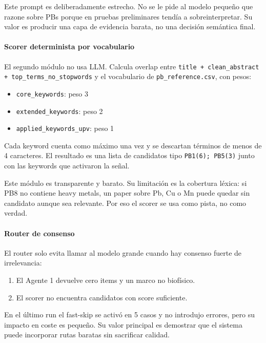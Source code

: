 Este prompt es deliberadamente estrecho. No se le pide al modelo pequeño que razone sobre PBs porque en pruebas preliminares tendía a sobreinterpretar. Su valor es producir una capa de evidencia barata, no una decisión semántica final.

\paragraph*{Scorer determinista por vocabulario}

El segundo módulo no usa LLM. Calcula overlap entre \texttt{title + clean\_abstract + top\_terms\_no\_stopwords} y el vocabulario de \texttt{pb\_reference.csv}, con pesos:

\begin{itemize}
\item \texttt{core\_keywords}: peso 3
\item \texttt{extended\_keywords}: peso 2
\item \texttt{applied\_keywords\_upv}: peso 1
\end{itemize}

Cada keyword cuenta como máximo una vez y se descartan términos de menos de 4 caracteres. El resultado es una lista de candidatos tipo \texttt{PB1(6); PB5(3)} junto con las keywords que activaron la señal.

Este módulo es transparente y barato. Su limitación es la cobertura léxica: si PB8 no contiene heavy metals, un paper sobre Pb, Cu o Mn puede quedar sin candidato aunque sea relevante. Por eso el scorer se usa como pista, no como verdad.

\paragraph*{Router de consenso}

El router solo evita llamar al modelo grande cuando hay consenso fuerte de irrelevancia:

\begin{enumerate}
\item El Agente 1 devuelve cero items y un marco no biofísico.
\item El scorer no encuentra candidatos con score suficiente.
\end{enumerate}

En el último run el fast-skip se activó en 5 casos y no introdujo errores, pero su impacto en coste es pequeño. Su valor principal es demostrar que el sistema puede incorporar rutas baratas sin sacrificar calidad.

